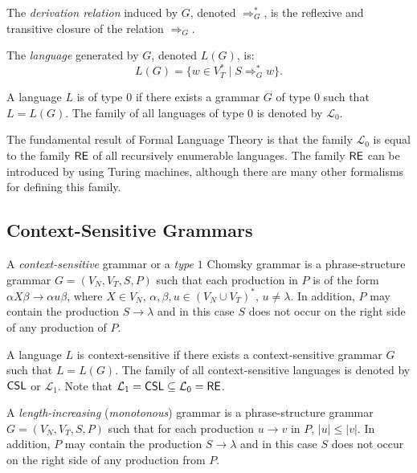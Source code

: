 The \emph{derivation relation} induced by $G$, denoted $\Rightarrow^*_G$, is the reflexive and transitive closure of the relation $\Rightarrow_G$.

The \emph{language} generated by $G$, denoted $L(G)$, is:
$$L(G) = \{w \in V_T^* \mid S \Rightarrow^*_G w\}.$$

A language $L$ is of type $0$ if there exists a grammar $G$ of type $0$ such that $L = L(G)$. The family of all languages of type $0$ is denoted by $\mathcal{L}_0$.

The fundamental result of Formal Language Theory is that the family $\mathcal{L}_0$ is equal to the family \index{$\RE$}$\RE$ of all recursively enumerable languages. The family $\RE$ can be introduced by using Turing machines, although there are many other formalisms for defining this family.

\subsection{Context-Sensitive Grammars}
\label{subsection:context-sensitive-grammars}

A \emph{context-sensitive} grammar or a \emph{type $1$} Chomsky grammar is a phrase-structure grammar $G = (V_N, V_T, S, P)$ such that each production in $P$ is of the form $\alpha X \beta \to \alpha u \beta$, where $X \in V_N$, $\alpha, \beta, u \in (V_N \cup V_T)^*$, $u \neq \lambda$. In addition, $P$ may contain the production $S \to \lambda$ and in this case $S$ does not occur on the right side of any production of $P$.

A language $L$ is context-sensitive if there exists a context-sensitive grammar $G$ such that $L = L(G)$. The family of all context-sensitive languages is denoted by \index{$\CSL$}$\CSL$ or $\mathcal{L}_1$. Note that $\mathcal{L}_1 = \textup{\sf CSL} \subseteq \mathcal{L}_0 = \textup{\sf RE}$.

A \emph{length-increasing} (\emph{monotonous}) grammar is a phrase-structure grammar $G = (V_N, V_T, S, P)$ such that for each production $u \to v$ in $P$, $|u| \le |v|$. In addition, $P$ may contain the production $S \to \lambda$ and in this case $S$ does not occur on the right side of any production from $P$.

